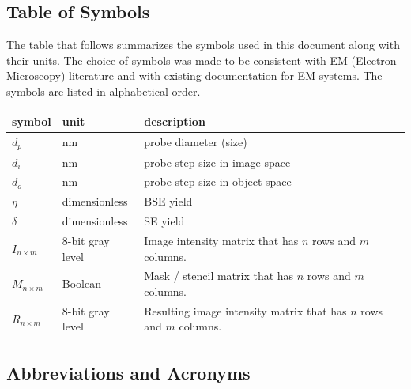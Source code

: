 \documentclass[12pt]{article}
\begin{document}
\subsection{Table of Symbols}

The table that follows summarizes the symbols used in this document along with
their units. The choice of symbols was made to be consistent with EM (Electron
Microscopy) literature and with existing documentation for EM systems. 
The symbols are listed in alphabetical order.

\renewcommand{\arraystretch}{1.2}
\noindent \begin{longtable*}{l l p{12cm}} \toprule
\textbf{symbol} & \textbf{unit} & \textbf{description}\\
\midrule 
$d_p$ & \si[per-mode=symbol] {\nm} & probe diameter (size)\\
$d_i$ & \si[per-mode=symbol] {\nm} & probe step size in image space\\
$d_o$ & \si[per-mode=symbol] {\nm} & probe step size in object space\\
$\eta$ & dimensionless & BSE yield \\
$\delta$ & dimensionless & SE yield \\
$I_{n\times m}$ & 8-bit gray level & Image intensity matrix that has $n$ rows and $m$ columns.\\
$M_{n\times m}$ & Boolean & Mask / stencil matrix that has $n$ rows and $m$ columns.\\
$R_{n\times m}$ & 8-bit gray level & Resulting image intensity matrix that has $n$ rows and $m$ columns.\\
\bottomrule
\end{longtable*}

\subsection{Abbreviations and Acronyms}
\end{document}
